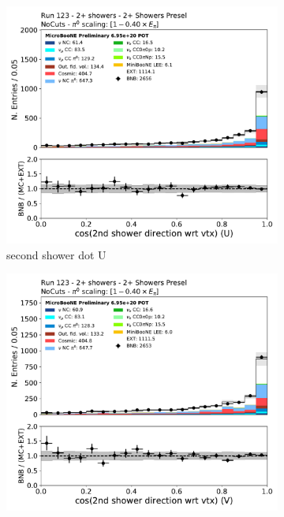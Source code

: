\begin{figure}[H]
    \centering
    \begin{subfigure}{0.3\textwidth}
    \includegraphics[width=1.0\textwidth]{Sidebands/Figures/TwoShr_1e0pSel/Presel/secondshower_U_dot.pdf}
    \caption{second shower dot U}
    \end{subfigure}
    \begin{subfigure}{0.3\textwidth}
    \includegraphics[width=1.0\textwidth]{Sidebands/Figures/TwoShr_1e0pSel/Presel/secondshower_V_dot.pdf}

\end{subfigure}
\end{figure}
